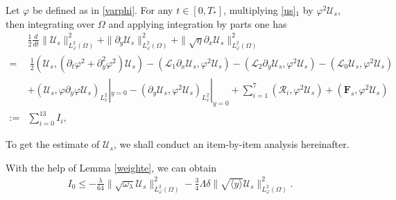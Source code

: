 \documentclass{amsart}
\numberwithin{equation}{section}
\newcommand\y{{{\langle y \rangle}}}
\begin{document}
Let $\varphi$ be defined as in \eqref{varphi}.
For any $t\in[0,T_{*}]$, multiplying \eqref{us}$_{1}$ by $\varphi^{2} \mathcal{U}_{s}$, then integrating over $\Omega$ and applying integration by parts one has
\begin{align}\label{he}
&\frac{1}{2}\frac{d}{dt}\|\mathcal{U}_{s}\|_{L_{\varphi}^{2}(\Omega)}^{2}
+\|\partial_{y}\mathcal{U}_{s}\|_{L_{\varphi}^{2}(\Omega)}^{2}
+\|\sqrt{\eta}\partial_{x}\mathcal{U}_{s}\|_{L_{\varphi}^{2}(\Omega)}^{2}\\
=&~\frac{1}{2}(\mathcal{U}_{s},(\partial_{t}\varphi^{2}+\partial_{y}^{2}\varphi^{2})\mathcal{U}_{s})
  -(\mathcal{L}_{1}\partial_{x}\mathcal{U}_{s},\varphi^{2}\mathcal{U}_{s})
  -(\mathcal{L}_{2}\partial_{y}\mathcal{U}_{s},\varphi^{2}\mathcal{U}_{s})
  -(\mathcal{L}_{0}\mathcal{U}_{s},\varphi^{2}\mathcal{U}_{s})\nonumber\\
 &+(\mathcal{U}_{s},\varphi\partial_{y}\varphi\mathcal{U}_{s})_{L_{x}^{2}}|_{y=0}
  -(\partial_{y}\mathcal{U}_{s},\varphi^{2}\mathcal{U}_{s})_{L_{x}^{2}}|_{y=0}
  +\sum_{i=1}^{7}(\mathcal{R}_{i},\varphi^{2}\mathcal{U}_{s})
  +(\mathbf{F}_{s},\varphi^{2}\mathcal{U}_{s})\nonumber\\
:=&\sum_{i=0}^{13}I_{i},\nonumber
\end{align}

To get the estimate of $\mathcal{U}_{s}$, we shall conduct an item-by-item analysis hereinafter.

With the help of Lemma \ref{weighte}, we can obtain
\begin{align*}
I_{0}\leq -\frac{\lambda}{64}\|\sqrt{\omega_{\lambda}}\mathcal{U}_{s}\|_{L_{\varphi}^{2}(\Omega)}^{2}
          -\frac{3}{4}\Lambda\delta\|\sqrt{\y}\mathcal{U}_{s}\|_{L_{\varphi}^{2}(\Omega)}^{2}.
\end{align*}
\end{document}
